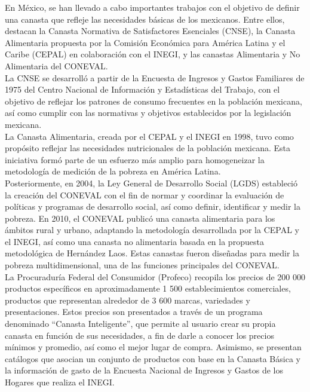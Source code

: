 \documentclass{article}
\begin{document}
En México, se han llevado a cabo importantes trabajos con el objetivo de definir una canasta que refleje las necesidades básicas de los mexicanos. Entre ellos, destacan la Canasta Normativa de Satisfactores Esenciales (CNSE), la Canasta Alimentaria propuesta por la Comisión Económica para América Latina y el Caribe (CEPAL) en colaboración con el INEGI, y las canastas Alimentaria y No Alimentaria del CONEVAL.\\

La CNSE se desarrolló a partir de la Encuesta de Ingresos y Gastos Familiares de 1975 del Centro Nacional de Información y Estadísticas del Trabajo, con el objetivo de reflejar los patrones de consumo frecuentes en la población mexicana, así como cumplir con las normativas y objetivos establecidos por la legislación mexicana.\\

La Canasta Alimentaria, creada por el CEPAL y el INEGI en 1998, tuvo como propósito reflejar las necesidades nutricionales de la población mexicana. Esta iniciativa formó parte de un esfuerzo más amplio para homogeneizar la metodología de medición de la pobreza en América Latina.\\

Posteriormente, en 2004, la Ley General de Desarrollo Social (LGDS) estableció la creación del CONEVAL con el fin de normar y coordinar la evaluación de políticas y programas de desarrollo social, así como definir, identificar y medir la pobreza. En 2010, el CONEVAL publicó una canasta alimentaria para los ámbitos rural y urbano, adaptando la metodología desarrollada por la CEPAL y el INEGI, así como una canasta no alimentaria basada en la propuesta metodológica de Hernández Laos. Estas canastas fueron diseñadas para medir la pobreza multidimensional, una de las funciones principales del CONEVAL.\\

La Procuraduría Federal del Consumidor (Profeco) recopila los precios de 200 000 productos específicos en aproximadamente 1 500 establecimientos comerciales, productos que representan alrededor de 3 600 marcas, variedades y presentaciones. Estos precios son presentados a través de un programa denominado “Canasta Inteligente”, que permite al usuario crear su propia canasta en función de sus necesidades, a fin de darle a conocer los precios mínimos y promedio, así como el mejor lugar de compra. Asimismo, se presentan catálogos que asocian un conjunto de productos con base en la Canasta Básica y la información de gasto de la Encuesta Nacional de Ingresos y Gastos de los Hogares que realiza el INEGI. 
\end{document}
